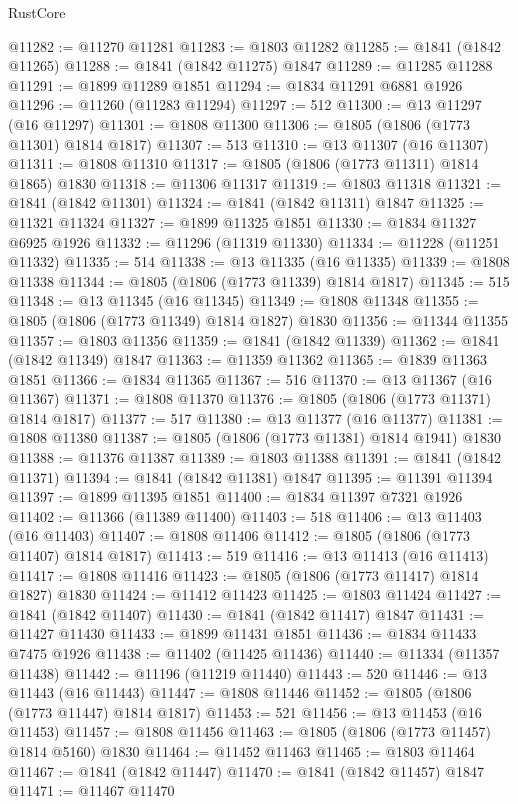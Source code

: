 \begin{lexlean}{RustCore}
\begin{coremodule}
@11282 := @11270 @11281
@11283 := @1803 @11282
@11285 := @1841 (@1842 @11265)
@11288 := @1841 (@1842 @11275) @1847
@11289 := @11285 @11288
@11291 := @1899 @11289 @1851
@11294 := @1834 @11291 @6881 @1926
@11296 := @11260 (@11283 @11294)
@11297 := 512
@11300 := @13 @11297 (@16 @11297)
@11301 := @1808 @11300
@11306 := @1805 (@1806 (@1773 @11301) @1814 @1817)
@11307 := 513
@11310 := @13 @11307 (@16 @11307)
@11311 := @1808 @11310
@11317 := @1805 (@1806 (@1773 @11311) @1814 @1865) @1830
@11318 := @11306 @11317
@11319 := @1803 @11318
@11321 := @1841 (@1842 @11301)
@11324 := @1841 (@1842 @11311) @1847
@11325 := @11321 @11324
@11327 := @1899 @11325 @1851
@11330 := @1834 @11327 @6925 @1926
@11332 := @11296 (@11319 @11330)
@11334 := @11228 (@11251 @11332)
@11335 := 514
@11338 := @13 @11335 (@16 @11335)
@11339 := @1808 @11338
@11344 := @1805 (@1806 (@1773 @11339) @1814 @1817)
@11345 := 515
@11348 := @13 @11345 (@16 @11345)
@11349 := @1808 @11348
@11355 := @1805 (@1806 (@1773 @11349) @1814 @1827) @1830
@11356 := @11344 @11355
@11357 := @1803 @11356
@11359 := @1841 (@1842 @11339)
@11362 := @1841 (@1842 @11349) @1847
@11363 := @11359 @11362
@11365 := @1839 @11363 @1851
@11366 := @1834 @11365
@11367 := 516
@11370 := @13 @11367 (@16 @11367)
@11371 := @1808 @11370
@11376 := @1805 (@1806 (@1773 @11371) @1814 @1817)
@11377 := 517
@11380 := @13 @11377 (@16 @11377)
@11381 := @1808 @11380
@11387 := @1805 (@1806 (@1773 @11381) @1814 @1941) @1830
@11388 := @11376 @11387
@11389 := @1803 @11388
@11391 := @1841 (@1842 @11371)
@11394 := @1841 (@1842 @11381) @1847
@11395 := @11391 @11394
@11397 := @1899 @11395 @1851
@11400 := @1834 @11397 @7321 @1926
@11402 := @11366 (@11389 @11400)
@11403 := 518
@11406 := @13 @11403 (@16 @11403)
@11407 := @1808 @11406
@11412 := @1805 (@1806 (@1773 @11407) @1814 @1817)
@11413 := 519
@11416 := @13 @11413 (@16 @11413)
@11417 := @1808 @11416
@11423 := @1805 (@1806 (@1773 @11417) @1814 @1827) @1830
@11424 := @11412 @11423
@11425 := @1803 @11424
@11427 := @1841 (@1842 @11407)
@11430 := @1841 (@1842 @11417) @1847
@11431 := @11427 @11430
@11433 := @1899 @11431 @1851
@11436 := @1834 @11433 @7475 @1926
@11438 := @11402 (@11425 @11436)
@11440 := @11334 (@11357 @11438)
@11442 := @11196 (@11219 @11440)
@11443 := 520
@11446 := @13 @11443 (@16 @11443)
@11447 := @1808 @11446
@11452 := @1805 (@1806 (@1773 @11447) @1814 @1817)
@11453 := 521
@11456 := @13 @11453 (@16 @11453)
@11457 := @1808 @11456
@11463 := @1805 (@1806 (@1773 @11457) @1814 @5160) @1830
@11464 := @11452 @11463
@11465 := @1803 @11464
@11467 := @1841 (@1842 @11447)
@11470 := @1841 (@1842 @11457) @1847
@11471 := @11467 @11470

\end{coremodule}
\end{lexlean}
